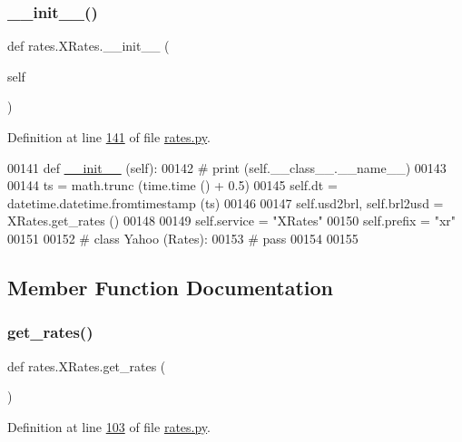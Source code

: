 \subsubsection{\texorpdfstring{\+\_\+\+\_\+init\+\_\+\+\_\+()}{\_\_init\_\_()}}
{\footnotesize\ttfamily def rates.\+X\+Rates.\+\_\+\+\_\+init\+\_\+\+\_\+ (\begin{DoxyParamCaption}\item[{}]{self }\end{DoxyParamCaption})}



Definition at line \hyperlink{rates_8py_source_l00141}{141} of file \hyperlink{rates_8py_source}{rates.\+py}.


\begin{DoxyCode}
00141     \textcolor{keyword}{def }\hyperlink{namespacestart__time_a9c9bd378729a13c96a22c8b079ea172c}{\_\_init\_\_} (self):
00142 \textcolor{comment}{#        print (self.\_\_class\_\_.\_\_name\_\_)}
00143 
00144         ts = math.trunc (time.time () + 0.5)
00145         self.dt = datetime.datetime.fromtimestamp (ts)
00146 
00147         self.usd2brl, self.brl2usd = XRates.get\_rates () 
00148                 
00149         self.service = \textcolor{stringliteral}{"XRates"}
00150         self.prefix = \textcolor{stringliteral}{"xr"}
00151 
00152 \textcolor{comment}{# class Yahoo (Rates):}
00153 \textcolor{comment}{#    pass}
00154 
00155 \end{DoxyCode}


\subsection{Member Function Documentation}
\mbox{\label{classrates_1_1_x_rates_a034e274f1bf0a2509af2621eb27c7cce}} 
\subsubsection{\texorpdfstring{get\+\_\+rates()}{get\_rates()}}
{\footnotesize\ttfamily def rates.\+X\+Rates.\+get\+\_\+rates (\begin{DoxyParamCaption}{ }\end{DoxyParamCaption})}



Definition at line \hyperlink{rates_8py_source_l00103}{103} of file \hyperlink{rates_8py_source}{rates.\+py}.


